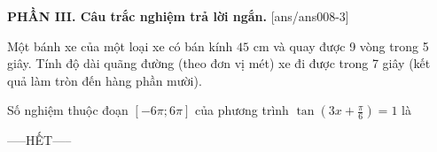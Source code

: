 \documentclass[12pt,a4paper]{article}
\begin{document}
{\bf PHẦN III. Câu trắc nghiệm trả lời ngắn.}
\setcounter{ex}{0}
[ans/ans008-3]
\begin{ex}
 Một bánh xe của một loại xe có bán kính ${45}$ cm và quay được 9 vòng trong 5 giây. Tính độ dài quãng đường (theo đơn vị mét) xe đi được trong 7 giây (kết quả làm tròn đến hàng phần mười). 

\end{ex}

\begin{ex}
 Số nghiệm thuộc đoạn $[- 6 \pi;6 \pi]$ của phương trình $\tan \left(3 x + \frac{\pi}{6}\right)=1$ là

\end{ex}


 \begin{center}
-----HẾT-----
\end{center}

\newpage 
\end{document}
